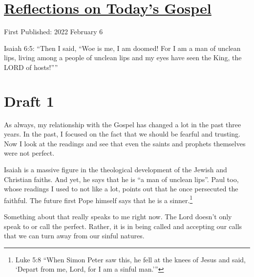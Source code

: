 \documentclass[12pt]{article}[titlepage]
\newcommand{\say}[1]{``#1''}
\newcommand{\nsay}[1]{`#1'}
\newcommand{\1}{\={a}}
\newcommand{\2}{\={e}}
\newcommand{\3}{\={\i}}
\newcommand{\4}{\=o}
\newcommand{\5}{\=u}
\newcommand{\6}{\={A}}
\renewcommand{\,}{\textsuperscript{,}}
\begin{document}
\doublespacing
\section{\href{reflections-on-readings-5-ordinary-c-22.html}{Reflections on Today's Gospel}}
First Published: 2022 February 6

Isaiah 6:5: \say{Then I said, \say{Woe is me, I am doomed! For I am a man of unclean lips, living among a people of unclean lips and my eyes have seen the King, the LORD of hosts!}}



\section{Draft 1}
As always, my relationship with the Gospel has changed a lot in the past three years.
In the past, I focused on the fact that we should be fearful and trusting.
Now I look at the readings and see that even the saints and prophets themselves were not perfect.

Isaiah is a massive figure in the theological development of the Jewish and Christian faiths.
And yet, he says that he is \say{a man of unclean lips}.
Paul too, whose readings I used to not like a lot, points out that he once persecuted the faithful.
The future first Pope himself says that he is a sinner.\footnote{Luke 5:8 \say{When Simon Peter saw this, he fell at the knees of Jesus and said, \nsay{Depart from me, Lord, for I am a sinful man.}}}

Something about that really speaks to me right now.
The Lord doesn't only speak to or call the perfect.
Rather, it is in being called and accepting our calls that we can turn away from our sinful natures.
\end{document}
